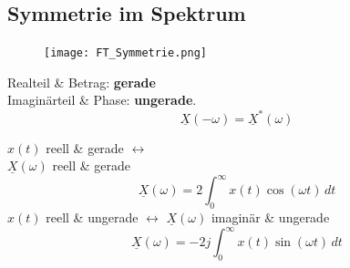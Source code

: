 \subsection{Symmetrie im Spektrum}
\begin{mdframed}[style=exercise, nobreak=true]
	\begin{figure}
		\vspace{-1.4em}
		\texttt{[image: FT\_Symmetrie.png]}
	\end{figure}
		Realteil \& Betrag: \textbf{gerade}\\
		Imaginärteil \& Phase: \textbf{ungerade}.
	\[
	\underline{X}(-\omega) = \underline{X}^*(\omega)
	\]

		$x(t)$ reell \& gerade $\leftrightarrow$\\ $\underline{X}(\omega)$  reell \& gerade
		$$\underline{X}(\omega) = 2\int_0^\infty x(t)\cos(\omega t)\,dt$$
		$x(t)$ reell \& ungerade $\leftrightarrow$ $\underline{X}(\omega)$ imaginär \& ungerade
		$$\underline{X}(\omega) = -2j\int_0^\infty x(t)\sin(\omega t)\,dt$$
\end{mdframed}

